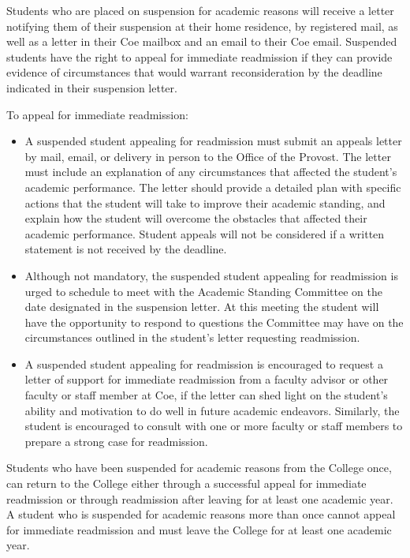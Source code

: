 \documentclass[
  letterpaper,
]{scrbook}
\providecommand{\tightlist}{%
  \setlength{\itemsep}{0pt}\setlength{\parskip}{0pt}}
\begin{document}
Students who are placed on suspension for academic reasons will receive
a letter notifying them of their suspension at their home residence, by
registered mail, as well as a letter in their Coe mailbox and an email
to their Coe email. Suspended students have the right to appeal for
immediate readmission if they can provide evidence of circumstances that
would warrant reconsideration by the deadline indicated in their
suspension letter.

To appeal for immediate readmission:

\begin{itemize}
\tightlist
\item
  A suspended student appealing for readmission must submit an appeals
  letter by mail, email, or delivery in person to the Office of the
  Provost. The letter must include an explanation of any circumstances
  that affected the student's academic performance. The letter should
  provide a detailed plan with specific actions that the student will
  take to improve their academic standing, and explain how the student
  will overcome the obstacles that affected their academic performance.
  Student appeals will not be considered if a written statement is not
  received by the deadline.
\item
  Although not mandatory, the suspended student appealing for
  readmission is urged to schedule to meet with the Academic Standing
  Committee on the date designated in the suspension letter. At this
  meeting the student will have the opportunity to respond to questions
  the Committee may have on the circumstances outlined in the student's
  letter requesting readmission.
\item
  A suspended student appealing for readmission is encouraged to request
  a letter of support for immediate readmission from a faculty advisor
  or other faculty or staff member at Coe, if the letter can shed light
  on the student's ability and motivation to do well in future academic
  endeavors. Similarly, the student is encouraged to consult with one or
  more faculty or staff members to prepare a strong case for
  readmission.
\end{itemize}

Students who have been suspended for academic reasons from the College
once, can return to the College either through a successful appeal for
immediate readmission or through readmission after leaving for at least
one academic year. A student who is suspended for academic reasons more
than once cannot appeal for immediate readmission and must leave the
College for at least one academic year.
\end{document}
